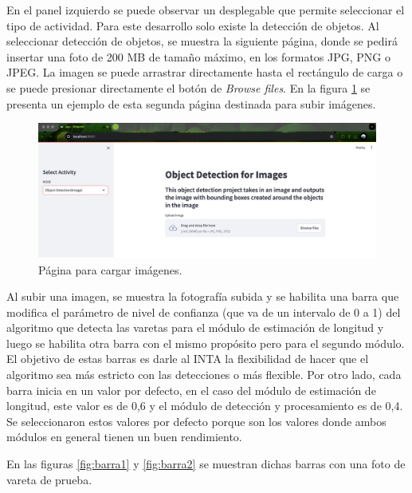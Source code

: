 En el panel izquierdo se puede observar un desplegable que permite seleccionar el tipo de actividad. Para este desarrollo solo existe la detección de objetos. Al seleccionar detección de objetos, se muestra la siguiente página, donde se pedirá insertar una foto de 200 MB de tamaño máximo, en los formatos JPG, PNG o JPEG. La imagen se puede arrastrar directamente hasta el rectángulo de carga o se puede presionar directamente el botón de \textit{Browse files}. En la figura \ref{fig:pantalla2} se presenta un ejemplo de esta segunda página destinada para subir imágenes.

\begin{figure}[ht]
	\centering
	\includegraphics[scale=0.13]{./Figures/pantalla2.png}
	\caption{Página para cargar imágenes.}
	\label{fig:pantalla2}
\end{figure}

Al subir una imagen, se muestra la fotografía subida y se habilita una barra que modifica el parámetro de nivel de confianza (que va de un intervalo de 0 a 1) del algoritmo que detecta las varetas para el módulo de estimación de longitud y luego se habilita otra barra con el mismo propósito pero para el segundo módulo. El objetivo de estas barras es darle al INTA la flexibilidad de hacer que el algoritmo sea más estricto con las detecciones o más flexible. Por otro lado, cada barra inicia en un valor por defecto, en el caso del módulo de estimación de longitud, este valor es de 0,6 y el módulo de detección y procesamiento es de 0,4. Se seleccionaron estos valores por defecto porque son los valores donde ambos módulos en general tienen un buen rendimiento.

En las figuras \ref{fig:barra1} y \ref{fig:barra2} se muestran dichas barras con una foto de vareta de prueba.

